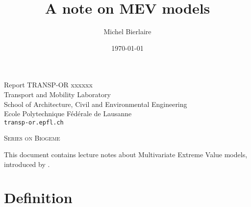 \documentclass[12pt,a4paper]{article}
\title{A note on MEV models}
\author{Michel Bierlaire}
\date{\today}
\begin{document}
\begin{titlepage}
\pagestyle{empty}

\maketitle
\vspace{2cm}

\begin{center}
\small Report TRANSP-OR xxxxxx \\ Transport and Mobility Laboratory \\ School of Architecture, Civil and Environmental Engineering \\ Ecole Polytechnique F\'ed\'erale de Lausanne \\ \verb+transp-or.epfl.ch+
\begin{center}
\textsc{Series on Biogeme}
\end{center}
\end{center}


\clearpage
\end{titlepage}



\clearpage 


This document contains lecture notes about Multivariate Extreme Value
models, introduced by .

\section{Definition}
\end{document}
